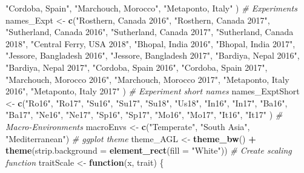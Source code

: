 \documentclass[
]{article}
\newenvironment{Shaded}{\begin{snugshade}}{\end{snugshade}}
\newcommand{\CommentTok}[1]{\textcolor[rgb]{0.56,0.35,0.01}{\textit{#1}}}
\newcommand{\ControlFlowTok}[1]{\textcolor[rgb]{0.13,0.29,0.53}{\textbf{#1}}}
\newcommand{\DataTypeTok}[1]{\textcolor[rgb]{0.13,0.29,0.53}{#1}}
\newcommand{\KeywordTok}[1]{\textcolor[rgb]{0.13,0.29,0.53}{\textbf{#1}}}
\newcommand{\NormalTok}[1]{#1}
\newcommand{\OperatorTok}[1]{\textcolor[rgb]{0.81,0.36,0.00}{\textbf{#1}}}
\newcommand{\StringTok}[1]{\textcolor[rgb]{0.31,0.60,0.02}{#1}}
\begin{document}
\begin{Shaded}
\begin{Highlighting}[]
                    \StringTok{"Cordoba, Spain"}\NormalTok{,   }\StringTok{"Marchouch, Morocco"}\NormalTok{,  }\StringTok{"Metaponto, Italy"}\NormalTok{ )}
\CommentTok{# Experiments}
\NormalTok{names_Expt <-}\StringTok{ }\KeywordTok{c}\NormalTok{(}\StringTok{"Rosthern, Canada 2016"}\NormalTok{,    }\StringTok{"Rosthern, Canada 2017"}\NormalTok{,}
                \StringTok{"Sutherland, Canada 2016"}\NormalTok{,  }\StringTok{"Sutherland, Canada 2017"}\NormalTok{, }
                \StringTok{"Sutherland, Canada 2018"}\NormalTok{,  }\StringTok{"Central Ferry, USA 2018"}\NormalTok{,}
                \StringTok{"Bhopal, India 2016"}\NormalTok{,       }\StringTok{"Bhopal, India 2017"}\NormalTok{,}
                \StringTok{"Jessore, Bangladesh 2016"}\NormalTok{, }\StringTok{"Jessore, Bangladesh 2017"}\NormalTok{,}
                \StringTok{"Bardiya, Nepal 2016"}\NormalTok{,      }\StringTok{"Bardiya, Nepal 2017"}\NormalTok{,}
                \StringTok{"Cordoba, Spain 2016"}\NormalTok{,      }\StringTok{"Cordoba, Spain 2017"}\NormalTok{,}
                \StringTok{"Marchouch, Morocco 2016"}\NormalTok{,  }\StringTok{"Marchouch, Morocco 2017"}\NormalTok{,}
                \StringTok{"Metaponto, Italy 2016"}\NormalTok{,    }\StringTok{"Metaponto, Italy 2017"}\NormalTok{ )}
\CommentTok{# Experiment short names}
\NormalTok{names_ExptShort <-}\StringTok{ }\KeywordTok{c}\NormalTok{(}\StringTok{"Ro16"}\NormalTok{, }\StringTok{"Ro17"}\NormalTok{, }\StringTok{"Su16"}\NormalTok{, }\StringTok{"Su17"}\NormalTok{, }\StringTok{"Su18"}\NormalTok{, }\StringTok{"Us18"}\NormalTok{,}
                     \StringTok{"In16"}\NormalTok{, }\StringTok{"In17"}\NormalTok{, }\StringTok{"Ba16"}\NormalTok{, }\StringTok{"Ba17"}\NormalTok{, }\StringTok{"Ne16"}\NormalTok{, }\StringTok{"Ne17"}\NormalTok{, }
                     \StringTok{"Sp16"}\NormalTok{, }\StringTok{"Sp17"}\NormalTok{, }\StringTok{"Mo16"}\NormalTok{, }\StringTok{"Mo17"}\NormalTok{, }\StringTok{"It16"}\NormalTok{, }\StringTok{"It17"}\NormalTok{ )}
\CommentTok{# Macro-Environments}
\NormalTok{macroEnvs <-}\StringTok{ }\KeywordTok{c}\NormalTok{(}\StringTok{"Temperate"}\NormalTok{, }\StringTok{"South Asia"}\NormalTok{, }\StringTok{"Mediterranean"}\NormalTok{)}
\CommentTok{# ggplot theme}
\NormalTok{theme_AGL <-}\StringTok{ }\KeywordTok{theme_bw}\NormalTok{() }\OperatorTok{+}\StringTok{ }\KeywordTok{theme}\NormalTok{(}\DataTypeTok{strip.background =} \KeywordTok{element_rect}\NormalTok{(}\DataTypeTok{fill =} \StringTok{"White"}\NormalTok{))}
\CommentTok{# Create scaling function}
\NormalTok{traitScale <-}\StringTok{ }\ControlFlowTok{function}\NormalTok{(x, trait) \{}

\end{Highlighting}
\end{Shaded}
\end{document}
